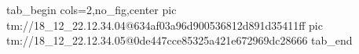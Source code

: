  
 
 
 
 

\qqSecOrig


\ifcmt
  tab_begin cols=2,no_fig,center
    pic tm://18_12_22.12.34.04@634af03a96d900536812d891d35411ff
    pic tm://18_12_22.12.34.05@0de447cce85325a421e672969dc28666
  tab_end
\fi

